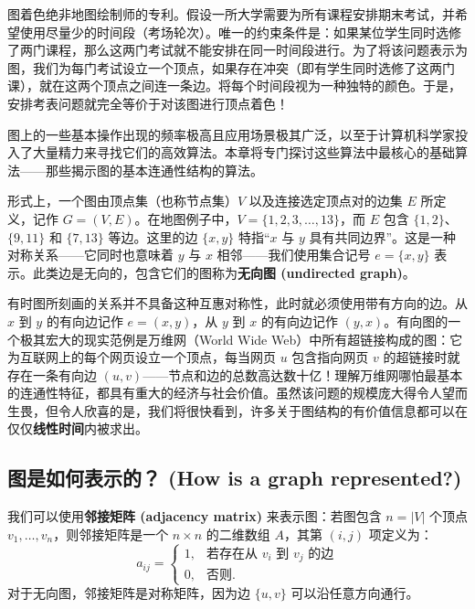 图着色绝非地图绘制师的专利。假设一所大学需要为所有课程安排期末考试，并希望使用尽量少的时间段（考场轮次）。唯一的约束条件是：如果某位学生同时选修了两门课程，那么这两门考试就不能安排在同一时间段进行。为了将该问题表示为图，我们为每门考试设立一个顶点，如果存在冲突（即有学生同时选修了这两门课），就在这两个顶点之间连一条边。将每个时间段视为一种独特的颜色。于是，安排考表问题就完全等价于对该图进行顶点着色！

图上的一些基本操作出现的频率极高且应用场景极其广泛，以至于计算机科学家投入了大量精力来寻找它们的高效算法。本章将专门探讨这些算法中最核心的基础算法——那些揭示图的基本连通性结构的算法。

形式上，一个图由顶点集（也称节点集）$V$ 以及连接选定顶点对的边集 $E$ 所定义，记作 $G = (V, E)$。在地图例子中，$V = \{1, 2, 3, \dots, 13\}$，而 $E$ 包含 $\{1, 2\}$、$\{9, 11\}$ 和 $\{7, 13\}$ 等边。这里的边 $\{x, y\}$ 特指“$x$ 与 $y$ 具有共同边界”。这是一种对称关系——它同时也意味着 $y$ 与 $x$ 相邻——我们使用集合记号 $e = \{x, y\}$ 表示。此类边是无向的，包含它们的图称为\textbf{无向图 (undirected graph)}。

有时图所刻画的关系并不具备这种互惠对称性，此时就必须使用带有方向的边。从 $x$ 到 $y$ 的有向边记作 $e = (x, y)$，从 $y$ 到 $x$ 的有向边记作 $(y, x)$。有向图的一个极其宏大的现实范例是万维网（World Wide Web）中所有超链接构成的图：它为互联网上的每个网页设立一个顶点，每当网页 $u$ 包含指向网页 $v$ 的超链接时就存在一条有向边 $(u, v)$——节点和边的总数高达数十亿！理解万维网哪怕最基本的连通性特征，都具有重大的经济与社会价值。虽然该问题的规模庞大得令人望而生畏，但令人欣喜的是，我们将很快看到，许多关于图结构的有价值信息都可以在仅仅\textbf{线性时间}内被求出。

\subsection{图是如何表示的？ (How is a graph represented?)}

我们可以使用\textbf{邻接矩阵 (adjacency matrix)} 来表示图：若图包含 $n = |V|$ 个顶点 $v_1, \dots, v_n$，则邻接矩阵是一个 $n \times n$ 的二维数组 $A$，其第 $(i, j)$ 项定义为：
\[
a_{ij} = \begin{cases}
1, & \text{若存在从 } v_i \text{ 到 } v_j \text{ 的边} \\
0, & \text{否则}.
\end{cases}
\]
对于无向图，邻接矩阵是对称矩阵，因为边 $\{u, v\}$ 可以沿任意方向通行。

